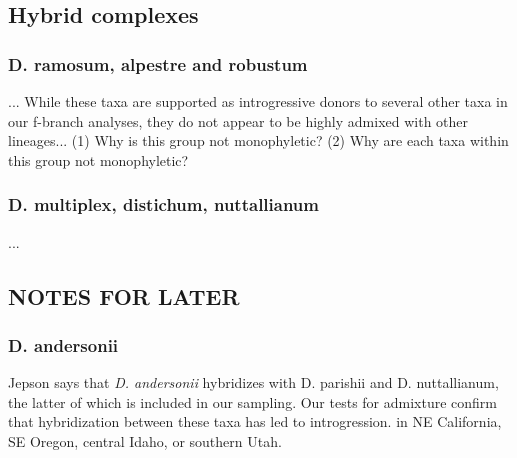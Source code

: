 \documentclass[11pt]{article}
\begin{document}


\subsection{Hybrid complexes}

\subsubsection{D. ramosum, alpestre and robustum}
...
While these taxa are supported as introgressive donors to several other taxa in 
our f-branch analyses, they do not appear to be highly admixed with other 
lineages...
(1) Why is this group not monophyletic?
(2) Why are each taxa within this group not monophyletic?


\subsubsection{D. multiplex, distichum, nuttallianum}
...



\subsection{NOTES FOR LATER}

\subsubsection{D. andersonii}
Jepson says that \emph{D. andersonii} hybridizes with D. parishii and D. nuttallianum,
the latter of which is included in our sampling. Our tests for admixture confirm
that hybridization between these taxa has led to introgression.
in NE California, SE Oregon, central Idaho, or southern Utah. 
\end{document}
